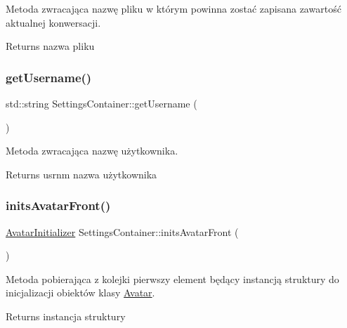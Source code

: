 Metoda zwracająca nazwę pliku w którym powinna zostać zapisana zawartość aktualnej konwersacji. 

\begin{DoxyReturn}{Returns}
nazwa pliku 
\end{DoxyReturn}
\mbox{\label{class_settings_container_a6a78401d4c64c4e67075a7af2c8b240f}} 
\subsubsection{\texorpdfstring{getUsername()}{getUsername()}}
{\footnotesize\ttfamily std\+::string Settings\+Container\+::get\+Username (\begin{DoxyParamCaption}{ }\end{DoxyParamCaption})\hspace{0.3cm}{\ttfamily [inline]}}



Metoda zwracająca nazwę użytkownika. 

\begin{DoxyReturn}{Returns}
usrnm nazwa użytkownika 
\end{DoxyReturn}
\mbox{\label{class_settings_container_afa7c4b8ddb91e7ad4cf055d48bd70d8b}} 
\subsubsection{\texorpdfstring{initsAvatarFront()}{initsAvatarFront()}}
{\footnotesize\ttfamily \mbox{\hyperlink{struct_avatar_initializer}{Avatar\+Initializer}} Settings\+Container\+::inits\+Avatar\+Front (\begin{DoxyParamCaption}{ }\end{DoxyParamCaption})}



Metoda pobierająca z kolejki pierwszy element będący instancją struktury do inicjalizacji obiektów klasy \mbox{\hyperlink{class_avatar}{Avatar}}. 

\begin{DoxyReturn}{Returns}
instancja struktury 
\end{DoxyReturn}
\mbox{\label{class_settings_container_a0feef9027567bf372b846acc25d25db2}} 
